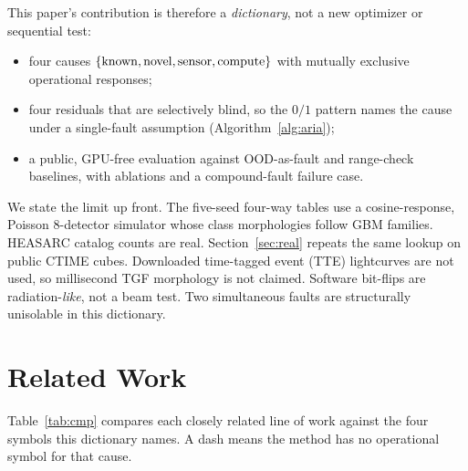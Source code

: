 \documentclass[journal]{IEEEtran}
\begin{document}
This paper's contribution is therefore a \emph{dictionary}, not a new optimizer or sequential test:
\begin{itemize}
\item four causes $\{{\rm known},{\rm novel},{\rm sensor},{\rm compute}\}$ with mutually exclusive operational responses;
\item four residuals that are selectively blind, so the $0/1$ pattern names the cause under a single-fault assumption (Algorithm~\ref{alg:aria});
\item a public, GPU-free evaluation against OOD-as-fault and range-check baselines, with ablations and a compound-fault failure case.
\end{itemize}

We state the limit up front. The five-seed four-way tables use a cosine-response, Poisson 8-detector simulator whose class morphologies follow GBM families. HEASARC catalog counts are real. Section~\ref{sec:real} repeats the same lookup on \RealCubes{} public CTIME cubes. Downloaded time-tagged event (TTE) lightcurves are not used, so millisecond TGF morphology is not claimed. Software bit-flips are radiation-\emph{like}, not a beam test. Two simultaneous faults are structurally unisolable in this dictionary.

\section{Related Work}

Table~\ref{tab:cmp} compares each closely related line of work against the four symbols this dictionary names. A dash means the method has no operational symbol for that cause.
\end{document}
